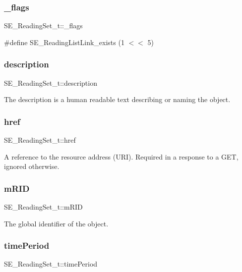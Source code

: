 \subsubsection{\texorpdfstring{\+\_\+flags}{\_flags}}
{\footnotesize\ttfamily S\+E\+\_\+\+Reading\+Set\+\_\+t\+::\+\_\+flags}

\#define S\+E\+\_\+\+Reading\+List\+Link\+\_\+exists (1 $<$$<$ 5) \mbox{\label{group__ReadingSet_gad67b558463072ec2819dd73f6ef2ee7b}} 
\subsubsection{\texorpdfstring{description}{description}}
{\footnotesize\ttfamily S\+E\+\_\+\+Reading\+Set\+\_\+t\+::description}

The description is a human readable text describing or naming the object. \mbox{\label{group__ReadingSet_gabdc2579f4df7fa4a87a23c41d057cf51}} 
\subsubsection{\texorpdfstring{href}{href}}
{\footnotesize\ttfamily S\+E\+\_\+\+Reading\+Set\+\_\+t\+::href}

A reference to the resource address (U\+RI). Required in a response to a G\+ET, ignored otherwise. \mbox{\label{group__ReadingSet_gadeeb229d0f424fe8275177847d9764fb}} 
\subsubsection{\texorpdfstring{m\+R\+ID}{mRID}}
{\footnotesize\ttfamily S\+E\+\_\+\+Reading\+Set\+\_\+t\+::m\+R\+ID}

The global identifier of the object. \mbox{\label{group__ReadingSet_gac688cdc34b6fb2eda9be0d9cd660f8ae}} 
\subsubsection{\texorpdfstring{time\+Period}{timePeriod}}
{\footnotesize\ttfamily S\+E\+\_\+\+Reading\+Set\+\_\+t\+::time\+Period}

